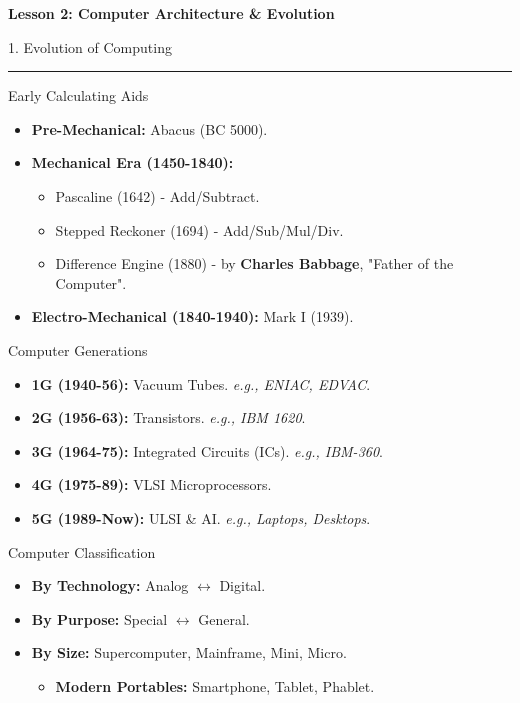 \documentclass[a4paper, 8pt]{extarticle}
\newcommand{\sectionheading}[1]{%
  \par\vspace{0.6em} %
  {\headingfont\fontsize{10.5pt}{11.5pt}\selectfont\color{black}#1}\par\nopagebreak
  \rule{\linewidth}{0.4pt}\vspace{0.2em}\nopagebreak
}
\newcommand{\subsectionheading}[1]{%
  \par\vspace{0.3em}\nopagebreak
  {\headingfont\fontsize{9pt}{10pt}\selectfont\color{black!80}#1}\par\nopagebreak\vspace{-0.3em}
}
\begin{document}
\pagestyle{empty}

\begin{center}
    {\headingfont\fontsize{12pt}{14pt}\selectfont \textbf{Lesson 2: Computer Architecture \& Evolution}}
\end{center}
\vspace{-0.8em}

\begin{multicols}{2}


\sectionheading{1. Evolution of Computing}
\subsectionheading{Early Calculating Aids}
\begin{itemize}
    \item \textbf{Pre-Mechanical:} Abacus (BC 5000).
    \item \textbf{Mechanical Era (1450-1840):}
        \begin{itemize}
            \item Pascaline (1642) - Add/Subtract.
            \item Stepped Reckoner (1694) - Add/Sub/Mul/Div.
            \item Difference Engine (1880) - by \textbf{Charles Babbage}, "Father of the Computer".
        \end{itemize}
    \item \textbf{Electro-Mechanical (1840-1940):} Mark I (1939).
\end{itemize}

\subsectionheading{Computer Generations}
\begin{itemize}
    \item \textbf{1G (1940-56):} Vacuum Tubes. \textit{e.g., ENIAC, EDVAC}.
    \item \textbf{2G (1956-63):} Transistors. \textit{e.g., IBM 1620}.
    \item \textbf{3G (1964-75):} Integrated Circuits (ICs). \textit{e.g., IBM-360}.
    \item \textbf{4G (1975-89):} VLSI Microprocessors.
    \item \textbf{5G (1989-Now):} ULSI \& AI. \textit{e.g., Laptops, Desktops}.
\end{itemize}

\subsectionheading{Computer Classification}
\begin{itemize}
    \item \textbf{By Technology:} Analog $\leftrightarrow$ Digital.
    \item \textbf{By Purpose:} Special $\leftrightarrow$ General.
    \item \textbf{By Size:} Supercomputer, Mainframe, Mini, Micro.
        \begin{itemize}
            \item \textbf{Modern Portables:} Smartphone, Tablet, Phablet.
        \end{itemize}
\end{itemize}


\end{multicols}
\end{document}
